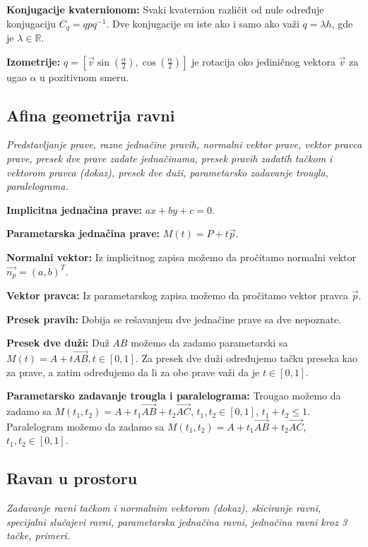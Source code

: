 \documentclass[12pt]{article}
\newcommand{\vek}[1]{\overrightarrow{#1}}
\begin{document}
\textbf{Konjugacije kvaternionom:} Svaki kvaternion različit od nule određuje
konjugaciju $C_q=qpq^{-1}$. Dve konjugacije su iste ako i samo ako važi
$q=\lambda h$, gde je $\lambda\in\mathbb{R}$. \par
\textbf{Izometrije:} $q=[\vek{v}\sin(\frac{\alpha}{2}),\cos(\frac{\alpha}{2})]$
je rotacija oko jediničnog vektora $\vek{v}$ za ugao $\alpha$ u pozitivnom
smeru.
\par

\subsection{Afina geometrija ravni}
\textit{Predstavljanje prave, razne jednačine pravih, normalni vektor prave,
    vektor pravca prave, presek dve prave zadate jednačinama, presek pravih
    zadatih tačkom i vektorom pravca (dokaz), presek dve duži, parametarsko
    zadavanje trougla, paralelograma.}
\par
\vspace*{1cm}

\textbf{Implicitna jednačina prave:} $ax+by+c=0$.
\par

\textbf{Parametarska jednačina prave:} $M(t)=P+t\vek{p}$.
\par

\textbf{Normalni vektor:} Iz implicitnog zapisa možemo da pročitamo normalni
vektor $\vek{n_p}=(a,b)^T$.
\par

\textbf{Vektor pravca:} Iz parametarskog zapisa možemo da pročitamo vektor
pravca $\vek{p}$.
\par

\textbf{Presek pravih:} Dobija se rešavanjem dve jednačine prave sa dve
nepoznate.
\par

\textbf{Presek dve duži:} Duž $AB$ možemo da zadamo parametarski sa
$M(t)=A+t\vek{AB}, t\in[0,1]$. Za presek dve duži određujemo tačku preseka
kao za prave, a zatim određujemo da li za obe prave važi da je $t\in[0,1]$.
\par

\textbf{Parametarsko zadavanje trougla i paralelograma:} Trougao možemo da
zadamo sa $M(t_1,t_2)=A+t_1\vek{AB}+t_2\vek{AC}$, $t_1,t_2\in[0,1]$, $t_1+t_2\leq1$.
Paralelogram možemo da zadamo sa $M(t_1,t_2)=A+t_1\vek{AB}+t_2\vek{AC}$, $t_1,t_2\in[0,1]$.

\subsection{Ravan u prostoru}
\textit{Zadavanje ravni tačkom i normalnim vektorom (dokaz), skiciranje ravni,
    specijalni slučajevi ravni, parametarska jednačina ravni, jednačina ravni kroz
    3 tačke, primeri.}
\par
\vspace*{1cm}
\end{document}
